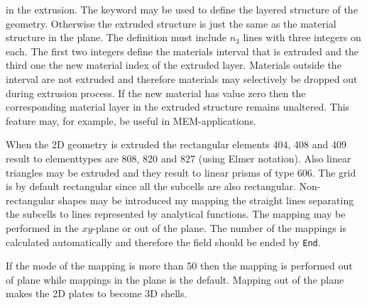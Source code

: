 in the extrusion. 
%
The keyword may be used to define the layered 
structure of the geometry. Otherwise the extruded structure is just the same
as the material structure in the plane. 
The definition must include $n_3$ lines with three integers on each. 
The first two integers define the materials interval that is extruded and
the third one the new material index of the extruded layer.
Materials outside the interval are not extruded and therefore 
materials may selectively be dropped out during extrusion process. 
If the new material has value zero then the corresponding material layer in the 
extruded structure remains unaltered.
This feature may, for example, be useful in MEM-applications. 

When the 2D geometry is extruded the rectangular elements 404, 408 and 409 result to 
elementtypes are 808, 820 and 827 (using Elmer notation). 
Also linear triangles may be extruded and they result to 
linear prisms of type 606.
%
The grid is by default rectangular since all the subcells are also
rectangular. Non-rectangular shapes may be introduced my mapping
the straight lines separating the subcells to lines represented by 
analytical functions. 
The mapping may be performed in the $xy$-plane or out of the plane.
The number of the mappings is calculated automatically and therefore 
the field should be ended by \texttt{End}.

If the mode of the mapping is more than 50 then 
the mapping is performed out of plane while mappings 
in the plane is the default.
Mapping out of the plane makes the 2D plates to become 3D shells.

